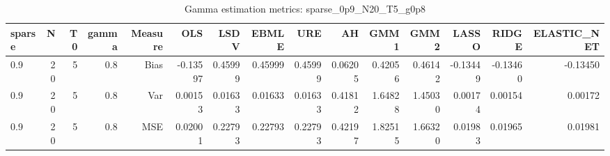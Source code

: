 \begin{table}[!htbp]\centering
\caption{Gamma estimation metrics: sparse_0p9_N20_T5_g0p8}
\label{tab:table1_sparse_0p9_N20_T5_g0p8}
\begin{tabular}{lrrrrrrrrrrrrrr}
\hline
sparse & N & T0 & gamma & Measure & OLS & LSDV & EBMLE & URE & AH & GMM1 & GMM2 & LASSO & RIDGE & ELASTIC_NET \\
\hline
0.9 & 20 & 5 & 0.8 & Bias & -0.13597 & 0.45999 & 0.45999 & 0.45999 & 0.06205 & 0.42056 & 0.46142 & -0.13449 & -0.13460 & -0.13450 \\
0.9 & 20 & 5 & 0.8 & Var & 0.00153 & 0.01633 & 0.01633 & 0.01633 & 0.41812 & 1.64828 & 1.45030 & 0.00174 & 0.00154 & 0.00172 \\
0.9 & 20 & 5 & 0.8 & MSE & 0.02001 & 0.22793 & 0.22793 & 0.22793 & 0.42197 & 1.82515 & 1.66320 & 0.01983 & 0.01965 & 0.01981 \\
\hline
\end{tabular}
\end{table}

